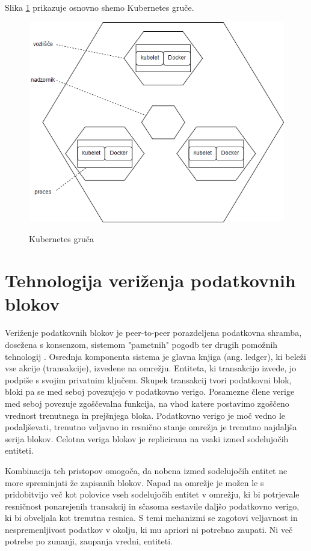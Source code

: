 \documentclass[a4paper, 12pt]{book}
\begin{document}
Slika \ref{kubernetes_cluster} prikazuje osnovno shemo Kubernetes gruče.

\begin{figure}[h]
	\includegraphics[width=1.0\textwidth]{slike/kubernetes_cluster.png}
	\label{kubernetes_cluster}
	\caption{Kubernetes gruča \cite{kubernetesTutorial}}
\end{figure}


\chapter{Tehnologija veriženja podatkovnih blokov}
\label{ch2}

Veriženje podatkovnih blokov je peer-to-peer porazdeljena podatkovna shramba, dosežena s konsenzom, sistemom "pametnih" pogodb ter drugih pomožnih tehnologij \cite{hyperledgerWeb}. Osrednja komponenta sistema je glavna knjiga (ang. ledger), ki beleži vse akcije (transakcije), izvedene na omrežju. \cite{hyperledgerDocs}
Entiteta, ki transakcijo izvede, jo podpiše s svojim privatnim ključem.
Skupek transakcij tvori podatkovni blok, bloki pa se med seboj povezujejo v podatkovno verigo.
Posamezne člene verige med seboj povezuje zgoščevalna funkcija, na vhod katere postavimo zgoščeno vrednost trenutnega in prejšnjega bloka.
Podatkovno verigo je moč vedno le podaljševati, trenutno veljavno in resnično stanje omrežja je trenutno najdaljša serija blokov.
Celotna veriga blokov je replicirana na vsaki izmed sodelujočih entiteti.

Kombinacija teh pristopov omogoča, da nobena izmed sodelujočih entitet ne more spreminjati že zapisanih blokov.
Napad na omrežje je možen le s pridobitvijo več kot polovice vseh sodelujočih entitet v omrežju, ki bi potrjevale resničnost ponarejenih transakcij in sčasoma sestavile daljšo podatkovno verigo, ki bi obveljala kot trenutna resnica.
S temi mehanizmi se zagotovi veljavnost in nespremenljivost podatkov v okolju, ki mu apriori ni potrebno zaupati.
Ni več potrebe po zunanji, zaupanja vredni, entiteti.
\end{document}
